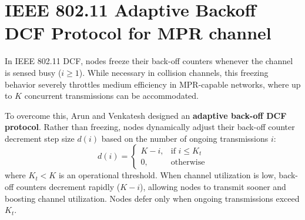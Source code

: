 \section{IEEE 802.11 Adaptive Backoff DCF Protocol for MPR channel}
In IEEE 802.11 DCF, nodes freeze their back-off counters whenever the channel is sensed busy ($i \ge 1$). While necessary in collision channels, this freezing behavior severely throttles medium efficiency in MPR-capable networks, where up to $K$ concurrent transmissions can be accommodated.

To overcome this, Arun and Venkatesh \cite{arun2017design} designed an \textbf{adaptive back-off DCF protocol}. Rather than freezing, nodes dynamically adjust their back-off counter decrement step size $d(i)$ based on the number of ongoing transmissions $i$:
\begin{equation}
    d(i) = \begin{cases}
        K - i, & \text{if } i \le K_t \\
        0, & \text{otherwise}
    \end{cases}
    \label{eq:mpr_dcf_decrement}
\end{equation}
where $K_t < K$ is an operational threshold. When channel utilization is low, back-off counters decrement rapidly ($K - i$), allowing nodes to transmit sooner and boosting channel utilization. Nodes defer only when ongoing transmissions exceed $K_t$.

